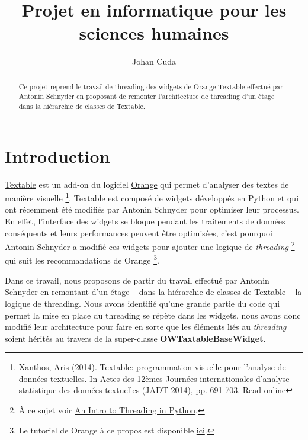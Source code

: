 \documentclass{article}
\title{Projet en informatique pour les sciences humaines}
\author{Johan Cuda}
\begin{document}
\maketitle

\begin{abstract}
Ce projet reprend le travail de threading des widgets de Orange Textable effectué par Antonin Schnyder en proposant de remonter l'architecture de threading d'un étage dans la hiérarchie de classes de Textable. 
\end{abstract}

\tableofcontents

\section{Introduction}

\href{http://textable.io/}{Textable} est un add-on du logiciel \href{https://orangedatamining.com/}{Orange} qui permet d'analyser des textes de manière visuelle \footnote{Xanthos, Aris (2014). Textable: programmation visuelle pour l’analyse de données textuelles. In Actes des 12èmes Journées internationales d’analyse statistique des données textuelles (JADT 2014), pp. 691-703. \href{http://lexicometrica.univ-paris3.fr/jadt/jadt2014/01-ACTES/57-JADT2014.pdf}{Read online}}. Textable est composé de widgets développés en Python et qui ont récemment été modifiés par Antonin Schnyder pour optimiser leur processus. En effet, l'interface des widgets se bloque pendant les traitements de données conséquents et leurs performances peuvent être optimisées, c'est pourquoi Antonin Schnyder a modifié ces widgets pour ajouter une logique de \textit{threading} \footnote{À ce sujet voir \href{https://realpython.com/intro-to-python-threading/}{An Intro to Threading in Python}.} qui suit les recommandations de Orange \footnote{Le tutoriel de Orange à ce propos est disponible \href{https://orange3.readthedocs.io/projects/orange-development/en/latest/tutorial-responsive-gui.html}{ici}.}.\newline

Dans ce travail, nous proposons de partir du travail effectué par Antonin Schnyder en remontant d'un étage – dans la hiérarchie de classes de Textable – la logique de threading. Nous avons identifié qu'une grande partie du code qui permet la mise en place du threading se répète dans les widgets, nous avons donc modifié  leur architecture pour faire en sorte que les éléments liés au \textit{threading} soient hérités au travers de la super-classe \textbf{OWTaxtableBaseWidget}.
\newline
\end{document}
